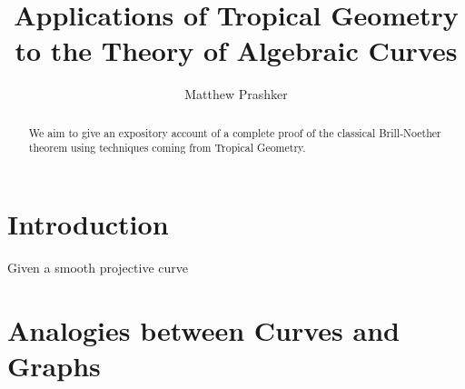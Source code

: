 \documentclass{article}
\title{Applications of Tropical Geometry to the Theory of Algebraic Curves}
\author{Matthew Prashker}
\begin{document}
\maketitle

\begin{abstract}
\noindent
We aim to give an expository account of a complete proof of the classical Brill-Noether theorem using techniques coming from Tropical Geometry.
\end{abstract}
\section{Introduction}
Given a smooth projective curve 
\section{Analogies between Curves and Graphs}
\label{analog}
\end{document}
